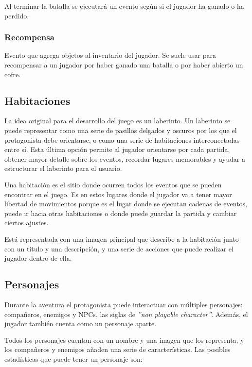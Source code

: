 Al terminar la batalla se ejecutará un evento según si el jugador ha ganado o ha perdido.

\subsubsection{Recompensa}
Evento que agrega objetos al inventario del jugador.
Se suele usar para recompensar a un jugador por haber ganado una batalla o por haber abierto un cofre.

\subsection{Habitaciones}
La idea original para el desarrollo del juego es un laberinto. Un laberinto se puede representar como una serie de pasillos delgados y oscuros por los que el protagonista debe orientarse, o como una serie de habitaciones interconectadas entre sí.
Esta última opción permite al jugador orientarse por cada partida, obtener mayor detalle sobre los eventos, recordar lugares memorables y ayudar a estructurar el laberinto para el usuario. 

Una habitación es el sitio donde ocurren todos los eventos que se pueden encontrar en el juego. Es en estos lugares donde el jugador va a tener mayor libertad de movimientos porque es el lugar donde se ejecutan cadenas de eventos, puede ir hacia otras habitaciones o donde puede guardar la partida y cambiar ciertos ajustes.

Está representada con una imagen principal que describe a la habitación junto con un título y una descripción, y una serie de acciones que puede realizar el jugador dentro de ella.

\subsection{Personajes}
Durante la aventura el protagonista puede interactuar con múltiples personajes: compañeros, enemigos y NPCs, las siglas de \textit{''non playable character''}. \cite{npcGeekno} Además, el jugador también cuenta como un personaje aparte.

Todos los personajes cuentan con un nombre y una imagen que los representa, y los compañeros y enemigos añaden una serie de características.
Las posibles estadísticas que puede tener un personaje son:

